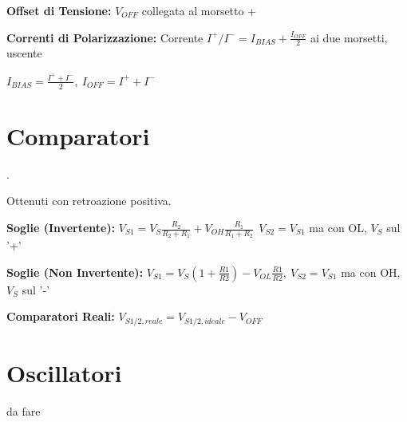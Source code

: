 \documentclass[12pt]{extarticle}
\begin{document}
{\bf Offset di Tensione:} $V_{OFF}$ collegata al morsetto +

{\bf Correnti di Polarizzazione:} Corrente $I^+/I^- = I_{BIAS}+\frac{I_{OFF}}{2}$ ai due morsetti, uscente

$\displaystyle I_{BIAS} = \frac{I^++I^-}{2}, \ I_{OFF} = I^++I^-$

\section{Comparatori}.

Ottenuti con retroazione positiva.

{\bf Soglie (Invertente):} $\displaystyle V_{S1} = V_S\frac{R_2}{R_2+R_1}+V_{OH}\frac{R_1}{R_1+R_2} \ \ V_{S2} = V_{S1} $ ma con OL, $V_S$ sul '+'

{\bf Soglie (Non Invertente):} $\displaystyle V_{S1} = V_S(1+\frac{R1}{R2}) - V_{OL}\frac{R1}{R2}, \ V_{S2} = V_{S1}$ ma con OH, $V_S$ sul '-'

{\bf Comparatori Reali:} $\displaystyle V_{S1/2, reale} = V_{S1/2, ideale}-V_{OFF}$

\section{Oscillatori}

da fare
\end{document}
